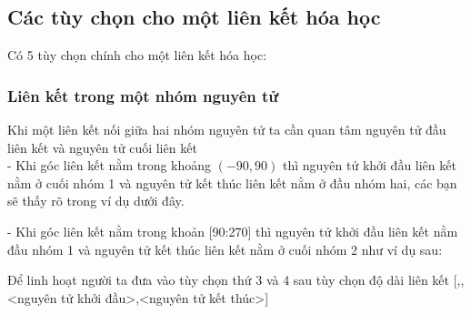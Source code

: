 \documentclass[Main.tex]{subfiles}
\begin{document}
	\subsection{Các tùy chọn cho một liên kết hóa học}
		Có 5 tùy chọn chính cho một liên kết hóa học:
		
		
		\subsubsection{Liên kết trong một nhóm nguyên tử}
		Khi một liên kết nối giữa hai nhóm nguyên tử ta cần quan tâm nguyên tử đầu liên kết và nguyên tử cuối liên kết
		\\
		- Khi góc liên kết nằm trong khoảng $(-90,90)$ thì nguyên tử khởi đầu liên kết nằm ở cuối nhóm 1 và nguyên tử kết thúc liên kết nằm ở đầu nhóm hai, các bạn sẽ thấy rõ trong ví dụ dưới đây.
		\begin{vd}
		\end{vd}
		\noindent- Khi góc liên kết nằm trong khoản [90:270] thì nguyên tử khởi đầu liên kết nằm đầu nhóm 1 và nguyên tử kết thúc liên kết nằm ở cuối nhóm 2 như ví dụ sau:
		\begin{vd}
		\end{vd}
		\noindent Để linh hoạt người ta đưa vào tùy chọn thứ 3 và 4 sau tùy chọn độ dài liên kết [,,<nguyên tử khởi đầu>,<nguyên tử kết thúc>]
		\begin{vd}
		\end{vd}
		
\end{document}
